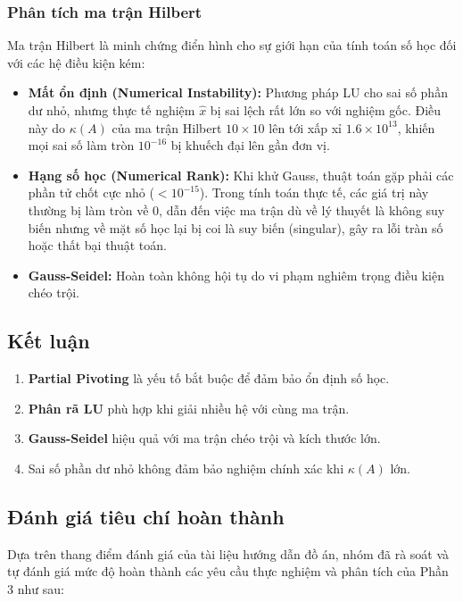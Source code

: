 \documentclass[a4paper]{article}
\begin{document}
\subsubsection{Phân tích ma trận Hilbert}

Ma trận Hilbert là minh chứng điển hình cho sự giới hạn của tính toán số học đối với các hệ điều kiện kém:
\begin{itemize}
    \item \textbf{Mất ổn định (Numerical Instability):} Phương pháp LU cho sai số phần dư nhỏ, nhưng thực tế nghiệm $\hat{x}$ bị sai lệch rất lớn so với nghiệm gốc. Điều này do $\kappa(A)$ của ma trận Hilbert $10 \times 10$ lên tới xấp xỉ $1.6 \times 10^{13}$, khiến mọi sai số làm tròn $10^{-16}$ bị khuếch đại lên gần đơn vị.
    \item \textbf{Hạng số học (Numerical Rank):} Khi khử Gauss, thuật toán gặp phải các phần tử chốt cực nhỏ ($< 10^{-15}$). Trong tính toán thực tế, các giá trị này thường bị làm tròn về $0$, dẫn đến việc ma trận dù về lý thuyết là không suy biến nhưng về mặt số học lại bị coi là suy biến (singular), gây ra lỗi tràn số hoặc thất bại thuật toán.
    \item \textbf{Gauss-Seidel:} Hoàn toàn không hội tụ do vi phạm nghiêm trọng điều kiện chéo trội.
\end{itemize}

\subsection{Kết luận}

\begin{enumerate}
    \item \textbf{Partial Pivoting} là yếu tố bắt buộc để đảm bảo ổn định số học.
    \item \textbf{Phân rã LU} phù hợp khi giải nhiều hệ với cùng ma trận.
    \item \textbf{Gauss-Seidel} hiệu quả với ma trận chéo trội và kích thước lớn.
    \item Sai số phần dư nhỏ không đảm bảo nghiệm chính xác khi $\kappa(A)$ lớn.
\end{enumerate}

\subsection{Đánh giá tiêu chí hoàn thành}

Dựa trên thang điểm đánh giá của tài liệu hướng dẫn đồ án, nhóm đã rà soát và tự đánh giá mức độ hoàn thành các yêu cầu thực nghiệm và phân tích của Phần 3 như sau:
\end{document}
